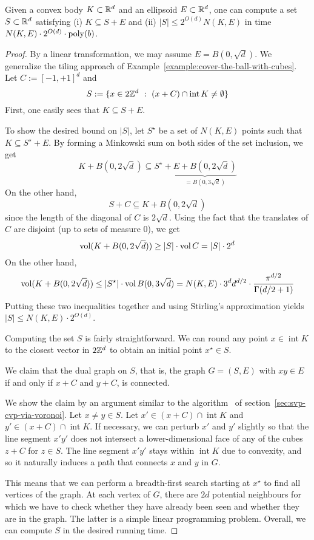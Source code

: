 \begin{lemma}
  Given a convex body $K \subset \mathbb{R}^d$ and an ellipsoid $E \subset \mathbb{R}^d$,
  one can compute a set $S \subset \mathbb{R}^d$ satisfying
  (i) $K \subseteq S + E$ and (ii) $|S| \leq 2^{O(d)} N(K,E)$
  in time $N(K,E) \cdot 2^{O(d)} \cdot \operatorname{poly}(b)$.
\end{lemma}
\begin{proof}
  By a linear transformation,
  we may assume $E = B(0,\sqrt{d})$.
  We generalize the tiling approach of Example~\ref{example:cover-the-ball-with-cubes}.
  Let $C := [-1,+1]^d$ and
  \[
    S := \{ x \in 2\mathbb{Z}^d ~:~ (x + C) \cap \operatorname{int} K \neq \emptyset \}
  \]
  First, one easily sees that $K \subseteq S + E$.
  
  To show the desired bound on $|S|$,
  let $S^\star$ be a set of $N(K,E)$ points
  such that $K \subseteq S^\star + E$.
  By forming a Minkowski sum on both sides of the set inclusion, we get
  \[
    K + B(0,2\sqrt{d}) \subseteq S^\star + \underbrace{E + B(0,2\sqrt{d})}_{= B(0,3\sqrt{d})}
  \]
  On the other hand,
  \[
    S + C \subseteq K + B(0,2\sqrt{d})
  \]
  since the length of the diagonal of $C$ is $2\sqrt{d}$.
  Using the fact that the translates of $C$ are disjoint (up to sets of measure $0$),
  we get
  \[
    \operatorname{vol}(K + B(0,2\sqrt{d})) \geq |S| \cdot \operatorname{vol} C = |S| \cdot 2^d
  \]
  On the other hand,
  \[
    \operatorname{vol}(K + B(0,2\sqrt{d})) \leq |S^\star| \cdot \operatorname{vol} B(0,3\sqrt{d})
    = N(K,E) \cdot 3^d d^{d/2} \cdot \frac{\pi^{d/2}}{\Gamma(d/2 + 1)}
  \]
  Putting these two inequalities together and using Stirling's approximation
  yields $|S| \leq N(K,E) \cdot 2^{O(d)}$.
  
  Computing the set $S$ is fairly straightforward.
  We can round any point $x \in \operatorname{int} K$ to the closest vector in $2 \mathbb{Z}^d$
  to obtain an initial point $x^\star \in S$.

  We claim that the dual graph on $S$,
  that is,
  the graph $G = (S,E)$ with $xy \in E$ if and only if $x+C$ and $y+C$,
  is connected.

  We show the claim by an argument similar to the algorithm~
  of section~\ref{sec:svp-cvp-via-voronoi}.
  Let $x \neq y \in S$.
  Let $x' \in (x+C) \cap \operatorname{int} K$ and $y' \in (x+C) \cap \operatorname{int} K$.
  If necessary, we can perturb $x'$ and $y'$ slightly
  so that the line segment $x'y'$
  does not intersect a lower-dimensional face of any of the cubes $z + C$ for $z \in S$.
  The line segment $x'y'$ stays within $\operatorname{int} K$ due to convexity,
  and so it naturally induces a path that connects $x$ and $y$ in $G$.

  This means that we can perform a breadth-first search starting at $x^\star$ to find all vertices of the graph.
  At each vertex of $G$, there are $2d$ potential neighbours for which we have to check
  whether they have already been seen and whether they are in the graph.
  The latter is a simple linear programming problem.
  Overall, we can compute $S$ in the desired running time.
\end{proof}

